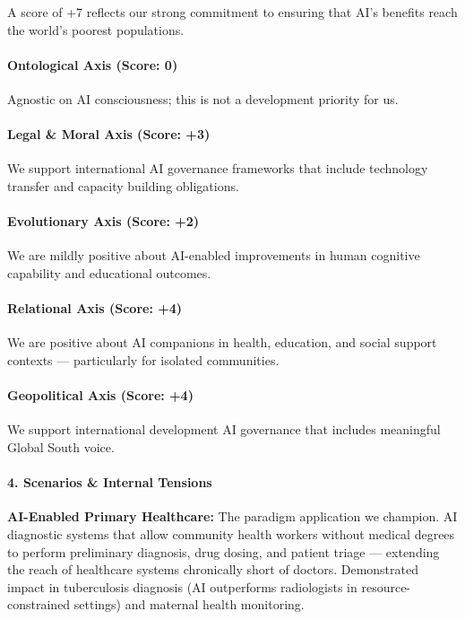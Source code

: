 A score of +7 reflects our strong commitment to ensuring that AI's
benefits reach the world's poorest populations.

\paragraph{Ontological Axis (Score:
0)}\label{ontological-axis-score-0-19}

Agnostic on AI consciousness; this is not a development priority for us.

\paragraph{Legal \& Moral Axis (Score:
+3)}\label{legal-moral-axis-score-3-1}

We support international AI governance frameworks that include
technology transfer and capacity building obligations.

\paragraph{Evolutionary Axis (Score:
+2)}\label{evolutionary-axis-score-2-5}

We are mildly positive about AI-enabled improvements in human cognitive
capability and educational outcomes.

\paragraph{Relational Axis (Score: +4)}\label{relational-axis-score-4-3}

We are positive about AI companions in health, education, and social
support contexts --- particularly for isolated communities.

\paragraph{Geopolitical Axis (Score:
+4)}\label{geopolitical-axis-score-4-1}

We support international development AI governance that includes
meaningful Global South voice.

\paragraph{4. Scenarios \& Internal
Tensions}\label{scenarios-internal-tensions-46}

\textbf{AI-Enabled Primary Healthcare:} The paradigm application we
champion. AI diagnostic systems that allow community health workers
without medical degrees to perform preliminary diagnosis, drug dosing,
and patient triage --- extending the reach of healthcare systems
chronically short of doctors. Demonstrated impact in tuberculosis
diagnosis (AI outperforms radiologists in resource-constrained settings)
and maternal health monitoring.

